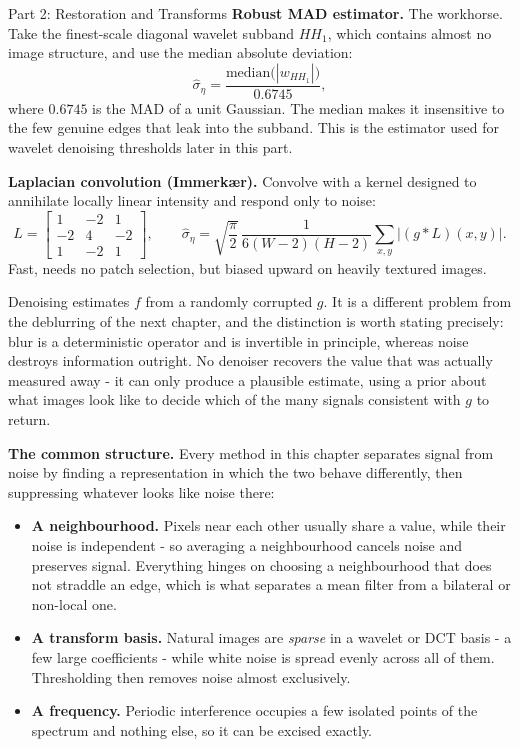 \documentclass[letterpaper]{article}
\begin{document}
\begin{notes}{Part 2: Restoration and Transforms}
\textbf{Robust MAD estimator.} The workhorse. Take the finest-scale diagonal wavelet subband $HH_1$, which contains almost no image structure, and use the median absolute deviation:
$$\hat\sigma_\eta = \frac{\mathrm{median}\bigl(|w_{HH_1}|\bigr)}{0.6745},$$
where $0.6745$ is the MAD of a unit Gaussian. The median makes it insensitive to the few genuine edges that leak into the subband. This is the estimator used for wavelet denoising thresholds later in this part.

\textbf{Laplacian convolution (Immerk\ae r).} Convolve with a kernel designed to annihilate locally linear intensity and respond only to noise:
$$L = \begin{bmatrix}1 & -2 & 1\\ -2 & 4 & -2\\ 1 & -2 & 1\end{bmatrix},\qquad \hat\sigma_\eta = \sqrt{\frac{\pi}{2}}\,\frac{1}{6(W-2)(H-2)}\sum_{x,y}\bigl|(g*L)(x,y)\bigr|.$$
Fast, needs no patch selection, but biased upward on heavily textured images.

\columnbreaknofill


Denoising estimates $f$ from a randomly corrupted $g$. It is a different problem from the deblurring of the next chapter, and the distinction is worth stating precisely: blur is a deterministic operator and is invertible in principle, whereas noise destroys information outright. No denoiser recovers the value that was actually measured away - it can only produce a plausible estimate, using a prior about what images look like to decide which of the many signals consistent with $g$ to return.

\textbf{The common structure.} Every method in this chapter separates signal from noise by finding a representation in which the two behave differently, then suppressing whatever looks like noise there:
\begin{itemize}
    \item \textbf{A neighbourhood.} Pixels near each other usually share a value, while their noise is independent - so averaging a neighbourhood cancels noise and preserves signal. Everything hinges on choosing a neighbourhood that does not straddle an edge, which is what separates a mean filter from a bilateral or non-local one.
    \item \textbf{A transform basis.} Natural images are \emph{sparse} in a wavelet or DCT basis - a few large coefficients - while white noise is spread evenly across all of them. Thresholding then removes noise almost exclusively.
    \item \textbf{A frequency.} Periodic interference occupies a few isolated points of the spectrum and nothing else, so it can be excised exactly.
\end{itemize}


\end{notes}
\end{document}

